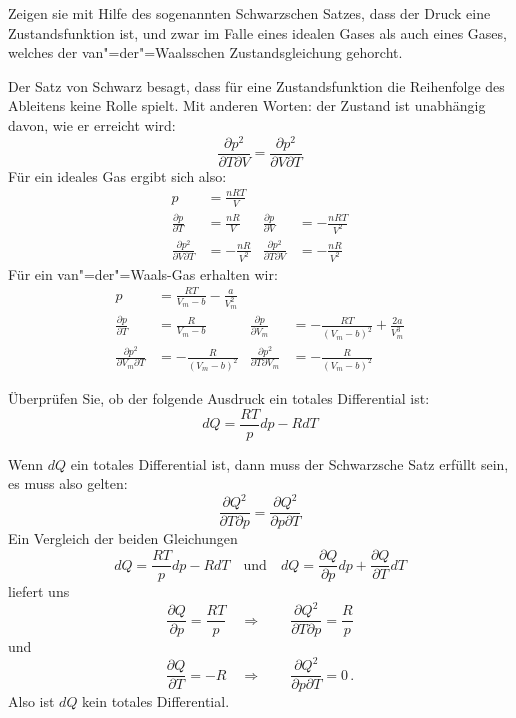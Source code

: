 \documentclass[DIV11]{scrartcl}
\begin{document}
\begin{question}[name=Druck als Zustandsfunktion]
Zeigen sie mit Hilfe des sogenannten Schwarzschen Satzes, dass der Druck eine
Zustandsfunktion ist, und zwar im Falle eines idealen Gases als auch eines
Gases, welches der van"=der"=Waalsschen Zustandsgleichung gehorcht.
\end{question}
\begin{solution}[name=Druck als Zustandsfunktion]
Der Satz von Schwarz besagt, dass für eine Zustandsfunktion die Reihenfolge
des Ableitens keine Rolle spielt. Mit anderen Worten: der Zustand ist
unabhängig davon, wie er erreicht wird:
\[
  \frac{\partial p^2}{\partial T \partial V}
  = \frac{\partial p^2}{\partial V \partial T}
\]
Für ein ideales Gas ergibt sich also:
\begin{align*}
 p &= \frac{nRT}{V}\\
 \frac{\partial p}{\partial T} &= \frac{nR}{V} & \frac{\partial p}{\partial V}
   &= -\frac{nRT}{V^2}\\
 \frac{\partial p^2}{\partial V\partial T}
   &= -\frac{nR}{V^2} & \frac{\partial p^2}{\partial T\partial V}
   &= -\frac{nR}{V^2}
\end{align*}
Für ein van"=der"=Waals-Gas erhalten wir:
\begin{align*}
 p &= \frac{RT}{V_m-b} - \frac{a}{V_m^2}\\
 \frac{\partial p}{\partial T}
   &= \frac{R}{V_m-b} & \frac{\partial p}{\partial V_m}
   &= -\frac{RT}{(V_m-b)^2} + \frac{2a}{V_m^3}\\
 \frac{\partial p^2}{\partial V_m\partial T}
   &= -\frac{R}{(V_m-b)^2} & \frac{\partial p^2}{\partial T\partial V_m}
   &= -\frac{R}{(V_m-b)^2}
\end{align*}
\end{solution}

\begin{question}[name=Totales Differential]
Überprüfen Sie, ob der folgende Ausdruck ein totales Differential ist:
\[ dQ = \frac{RT}{p}dp - RdT \]
\end{question}
\begin{solution}[name=Totales Differential]
Wenn $dQ$ ein totales Differential ist, dann muss der Schwarzsche Satz erfüllt
sein, es muss also gelten:
\[
  \frac{\partial Q^2}{\partial T\partial p} = \frac{\partial Q^2}{\partial p\partial T}
\]
Ein Vergleich der beiden Gleichungen
\[
  dQ = \frac{RT}{p}dp - RdT
  \quad \text{und} \quad
  dQ = \frac{\partial Q}{\partial p}dp + \frac{\partial Q}{\partial T}dT
\]
liefert uns
\[
  \frac{\partial Q}{\partial p} = \frac{RT}{p}
  \quad \Rightarrow \qquad
  \frac{\partial Q^2}{\partial T\partial p} = \frac{R}{p}
\]
und
\[
  \frac{\partial Q}{\partial T} = -R
  \quad \Rightarrow \qquad
  \frac{\partial Q^2}{\partial p\partial T} = 0 \,.
\]
Also ist $dQ$ kein totales Differential.
\end{solution}
\end{document}
